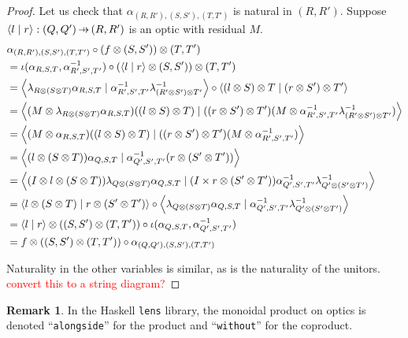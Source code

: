 \documentclass[11pt,letterpaper]{article}
\theoremstyle{plain}
\theoremstyle{definition}
\newtheorem{remark}[theorem]{Remark}
\newcommand{\lenslib}{\texttt{lens}}
\newcommand{\rep}[2]{{\ensuremath \left\langle #1 \mid #2 \right\rangle}}
\newcommand{\hto}{\ensuremath{\,\mathaccent\shortmid\rightarrow\,}}
\newcommand{\todo}[1]{\textcolor{red}{\small #1}}
\begin{document}
\begin{proof}
  Let us check that $\alpha_{(R, R'), (S, S'), (T, T')}$ is natural in $(R, R')$. Suppose $\rep{l}{r} : (Q, Q') \hto (R, R')$ is an optic with residual $M$.
  \begin{align*}
    &\alpha_{(R, R'), (S, S'), (T, T')} \circ (f \otimes (S, S')) \otimes (T, T') \\
    &= \iota(\alpha_{R,S,T}, \alpha_{R',S',T'}^{-1})  \circ (\rep{l}{r} \otimes (S, S')) \otimes (T, T') \\
    &= \rep{\lambda_{R \otimes (S \otimes T)}\alpha_{R,S,T}}{\alpha_{R',S',T'}^{-1} \lambda^{-1}_{(R' \otimes S') \otimes T'}}  \circ \rep{(l \otimes S) \otimes T}{(r \otimes S') \otimes T'} \\
    &= \rep{(M \otimes \lambda_{R \otimes (S \otimes T)}\alpha_{R,S,T})((l \otimes S) \otimes T)}{((r \otimes S') \otimes T') (M \otimes \alpha_{R',S',T'}^{-1} \lambda^{-1}_{(R' \otimes S') \otimes T'} )} \\
    &=\rep{(M \otimes \alpha_{R,S,T})((l \otimes S) \otimes T)}{((r \otimes S') \otimes T') (M \otimes \alpha_{R',S',T'}^{-1} )} \\
    &= \rep{(l \otimes (S \otimes T))\alpha_{Q,S,T}}{\alpha_{Q',S',T'}^{-1}(r \otimes (S' \otimes T'))} \\
    &= \rep{(I \otimes l \otimes (S \otimes T)) \lambda_{Q \otimes (S \otimes T)}\alpha_{Q,S,T}}{(I \times r \otimes (S' \otimes T')) \alpha_{Q',S',T'}^{-1} \lambda^{-1}_{Q' \otimes (S' \otimes T')}} \\
    &= \rep{l \otimes (S \otimes T)}{r \otimes (S' \otimes T')} \circ \rep{\lambda_{Q \otimes (S \otimes T)}\alpha_{Q,S,T}}{\alpha_{Q',S',T'}^{-1} \lambda^{-1}_{Q' \otimes (S' \otimes T')} } \\
    &= \rep{l}{r} \otimes ((S, S') \otimes (T, T')) \circ \iota(\alpha_{Q,S,T}, \alpha_{Q',S',T'}^{-1}) \\
    &= f \otimes ((S, S') \otimes (T, T')) \circ \alpha_{(Q, Q'), (S, S'), (T, T')}
  \end{align*}

Naturality in the other variables is similar, as is the naturality of the unitors.
  \todo{convert this to a string diagram?}
\end{proof}

\begin{remark}
  In the Haskell \lenslib{} library, the monoidal product on optics is denoted ``\texttt{alongside}'' for the product and ``\texttt{without}'' for the coproduct.
\end{remark}
\end{document}
